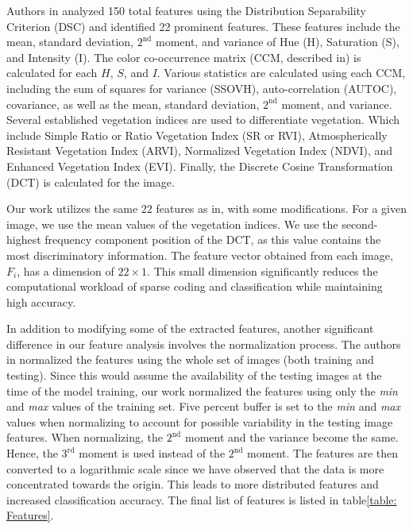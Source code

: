 Authors in\cite{Basu2015} analyzed 150 total features using the Distribution Separability Criterion (DSC) and identified 22 prominent features. These features include the mean, standard deviation, $2^\textrm{nd}$ moment, and variance of Hue (H), Saturation (S), and Intensity (I). The color co-occurrence matrix (CCM, described in\cite{Boyda2017}) is calculated for each $H$, $S$, and $I$. Various statistics are calculated using each CCM, including the sum of squares for variance (SSOVH), auto-correlation (AUTOC), covariance, as well as the mean, standard deviation, $2^\textrm{nd}$ moment, and variance. Several established vegetation indices are used to differentiate vegetation. Which include Simple Ratio or Ratio Vegetation Index (SR or RVI)\cite{Jordan1969}, Atmospherically Resistant Vegetation Index (ARVI)\cite{Kaufman1992}, Normalized Vegetation Index (NDVI)\cite{Rouse1974}, and Enhanced Vegetation Index (EVI)\cite{Huete2002}. Finally, the Discrete Cosine Transformation (DCT) is calculated for the image.

Our work utilizes the same $22$ features as in\cite{Basu2015}, with some modifications. For a given image, we use the mean values of the vegetation indices. We use the second-highest frequency component position of the DCT, as this value contains the most discriminatory information. The feature vector obtained from each image, $F_i$, has a dimension of $22\times1$. This small dimension significantly reduces the computational workload of sparse coding and classification while maintaining high accuracy.

In addition to modifying some of the extracted features, another significant difference in our feature analysis involves the normalization process. The authors in\cite{Basu2015} normalized the features using the whole set of images (both training and testing). Since this would assume the availability of the testing images at the time of the model training, our work normalized the features using only the \textit{min} and \textit{max} values of the training set. Five percent buffer is set to the \textit{min} and \textit{max} values when normalizing to account for possible variability in the testing image features. When normalizing, the $2^\textrm{nd}$ moment and the variance become the same. Hence, the $3^\textrm{rd}$ moment is used instead of the $2^\textrm{nd}$ moment. The features are then converted to a logarithmic scale since we have observed that the data is more concentrated towards the origin. This leads to more distributed features and increased classification accuracy. The final list of features is listed in table\ref{table: Features}.

